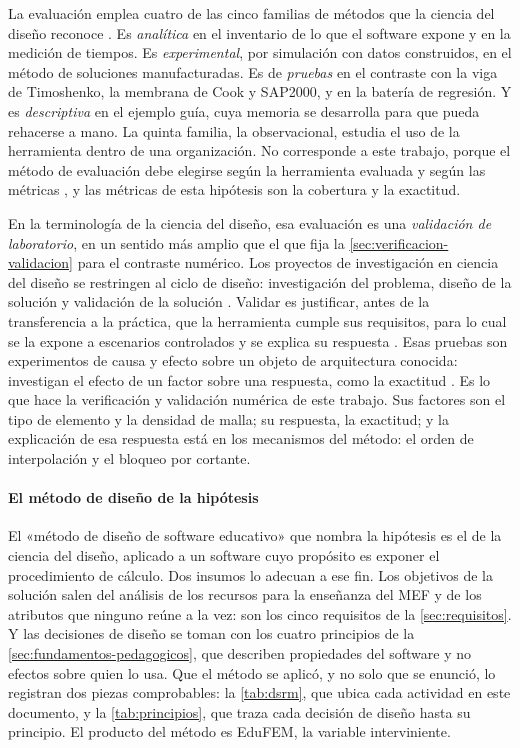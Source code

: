 La evaluación emplea cuatro de las cinco familias de métodos que la ciencia del diseño reconoce \autocite[p.~86]{hevner2004design}. Es \emph{analítica} en el inventario de lo que el software expone y en la medición de tiempos. Es \emph{experimental}, por simulación con datos construidos, en el método de soluciones manufacturadas. Es de \emph{pruebas} en el contraste con la viga de Timoshenko, la membrana de Cook y SAP2000, y en la batería de regresión. Y es \emph{descriptiva} en el ejemplo guía, cuya memoria se desarrolla para que pueda rehacerse a mano. La quinta familia, la observacional, estudia el uso de la herramienta dentro de una organización. No corresponde a este trabajo, porque el método de evaluación debe elegirse según la herramienta evaluada y según las métricas \autocite[p.~86]{hevner2004design}, y las métricas de esta hipótesis son la cobertura y la exactitud.

En la terminología de la ciencia del diseño, esa evaluación es una \emph{validación de laboratorio}, en un sentido más amplio que el que fija la \autoref{sec:verificacion-validacion} para el contraste numérico. Los proyectos de investigación en ciencia del diseño se restringen al ciclo de diseño: investigación del problema, diseño de la solución y validación de la solución \autocite[p.~30]{wieringa2014design}. Validar es justificar, antes de la transferencia a la práctica, que la herramienta cumple sus requisitos, para lo cual se la expone a escenarios controlados y se explica su respuesta \autocite[p.~31]{wieringa2014design}. Esas pruebas son experimentos de causa y efecto sobre un objeto de arquitectura conocida: investigan el efecto de un factor sobre una respuesta, como la exactitud \autocite[p.~247]{wieringa2014design}. Es lo que hace la verificación y validación numérica de este trabajo. Sus factores son el tipo de elemento y la densidad de malla; su respuesta, la exactitud; y la explicación de esa respuesta está en los mecanismos del método: el orden de interpolación y el bloqueo por cortante.

\paragraph{El método de diseño de la hipótesis} El «método de diseño de software educativo» que nombra la hipótesis es el de la ciencia del diseño, aplicado a un software cuyo propósito es exponer el procedimiento de cálculo. Dos insumos lo adecuan a ese fin. Los objetivos de la solución salen del análisis de los recursos para la enseñanza del MEF y de los atributos que ninguno reúne a la vez: son los cinco requisitos de la \autoref{sec:requisitos}. Y las decisiones de diseño se toman con los cuatro principios de la \autoref{sec:fundamentos-pedagogicos}, que describen propiedades del software y no efectos sobre quien lo usa. Que el método se aplicó, y no solo que se enunció, lo registran dos piezas comprobables: la \autoref{tab:dsrm}, que ubica cada actividad en este documento, y la \autoref{tab:principios}, que traza cada decisión de diseño hasta su principio. El producto del método es EduFEM, la variable interviniente.

